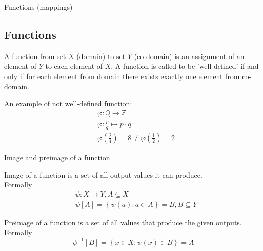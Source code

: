 \documentclass{beamer}
\begin{document}
\begin{frame}{Functions (mappings)}
    \subsection{Functions}
    \begin{definition}
        A function from set $X$ (domain) to set $Y$ (co-domain) is an assignment of an element of $Y$ to each element
        of $X$. A function is called to be 'well-defined' if and only if for each element from domain there exists 
        exactly one element from co-domain.  
    \end{definition}
    \begin{example}
        An example of not well-defined function: \\
        \begin{align*}
            & \varphi : \mathbb{Q} \to \mathbb{Z} \\
            & \varphi : \frac{p}{q} \mapsto p \cdot q \\
            & \varphi\left(\frac{2}{4}\right) = 8 \ne \varphi\left(\frac{1}{2}\right) = 2
        \end{align*}
    \end{example}
\end{frame}

\begin{frame}{Image and preimage of a function}
    \begin{definition}
        Image of a function is a set of all output values it can produce. \\
        Formally
        \begin{eqnarray*}
            & \psi : X \to Y, A \subseteq X \\
            & \psi[A] = \left\{\psi(a) : a \in A \right\} = B, B \subseteq Y
        \end{eqnarray*}
    \end{definition}
    \begin{definition}
        Preimage of a function is a set of all values that produce the given outputs.
        Formally
        \begin{equation*}
            \psi^{-1}[B] = \left\{x \in X : \psi(x) \in B \right\} = A
        \end{equation*}
    \end{definition}
\end{frame}
\end{document}
